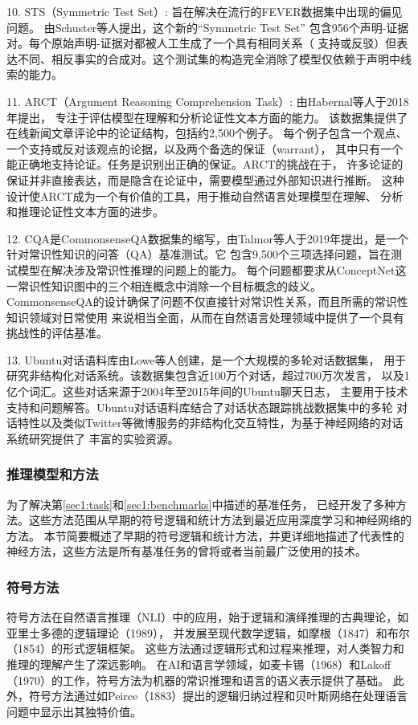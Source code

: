 10. STS（Symmetric Test Set）\cite{schuster2019towards}: 旨在解决在流行的FEVER数据集中出现的偏见问题。
由Schuster等人提出，这个新的``Symmetric Test Set''
包含956个声明-证据对。每个原始声明-证据对都被人工生成了一个具有相同关系（
支持或反驳）但表达不同、相反事实的合成对。这个测试集的构造完全消除了模型仅依赖于声明中线索的能力。

11. ARCT（Argument Reasoning Comprehension Task）\cite{habernal2018argument}: 由Habernal等人于2018年提出，
专注于评估模型在理解和分析论证性文本方面的能力。
该数据集提供了在线新闻文章评论中的论证结构，包括约2,500个例子。
每个例子包含一个观点、一个支持或反对该观点的论据，以及两个备选的保证（warrant），
其中只有一个能正确地支持论证。任务是识别出正确的保证。ARCT的挑战在于，
许多论证的保证并非直接表达，而是隐含在论证中，需要模型通过外部知识进行推断。
这种设计使ARCT成为一个有价值的工具，用于推动自然语言处理模型在理解、
分析和推理论证性文本方面的进步。

12. CQA是CommonsenseQA\cite{talmor2019commonsenseqa}数据集的缩写，由Talmor等人于2019年提出，是一个针对常识性知识的问答（QA）基准测试。它
包含9,500个三项选择问题，旨在测试模型在解决涉及常识性推理的问题上的能力。
每个问题都要求从ConceptNet这一常识性知识图中的三个相连概念中消除一个目标概念的歧义。
CommonsenseQA的设计确保了问题不仅直接针对常识性关系，而且所需的常识性知识领域对日常使用
来说相当全面，从而在自然语言处理领域中提供了一个具有挑战性的评估基准。

13. Ubuntu对话语料库\cite{lowe2015ubuntu}由Lowe等人创建，是一个大规模的多轮对话数据集，
用于研究非结构化对话系统。该数据集包含近100万个对话，超过700万次发言，
以及1亿个词汇。这些对话来源于2004年至2015年间的Ubuntu聊天日志，
主要用于技术支持和问题解答。Ubuntu对话语料库结合了对话状态跟踪挑战数据集中的多轮
对话特性以及类似Twitter等微博服务的非结构化交互特性，为基于神经网络的对话系统研究提供了
丰富的实验资源。

\subsubsection{推理模型和方法}
\label{sec1:approachs}
为了解决第\ref{sec1:task}和\ref{sec1:benchmarks}中描述的基准任务，
已经开发了多种方法。这些方法范围从早期的符号逻辑和统计方法到最近应用深度学习和神经网络的方法。
本节简要概述了早期的符号逻辑和统计方法，并更详细地描述了代表性的神经方法，这些方法是所有基准任务的曾将或者当前最广泛使用的技术。

\subsubsection*{符号方法}
符号方法在自然语言推理（NLI）中的应用，始于逻辑和演绎推理的古典理论，如亚里士多德的逻辑理论（1989）\cite{smith1989prior}，
并发展至现代数学逻辑，如摩根（1847）\cite{de1847formal}和布尔（1854）\cite{boole1854investigation}的形式逻辑框架。
这些方法通过逻辑形式和过程来推理，对人类智力和推理的理解产生了深远影响。
在AI和语言学领域，如麦卡锡（1968）\cite{mccarthy1959programs}和Lakoff（1970）\cite{lakoff1970linguistics}的工作，符号方法为机器的常识推理和语言的语义表示提供了基础。
此外，符号方法通过如Peirce（1883）\cite{peirce1883theory}提出的逻辑归纳过程和贝叶斯网络\cite{dechter2013reasoning}在处理语言问题中显示出其独特价值。

